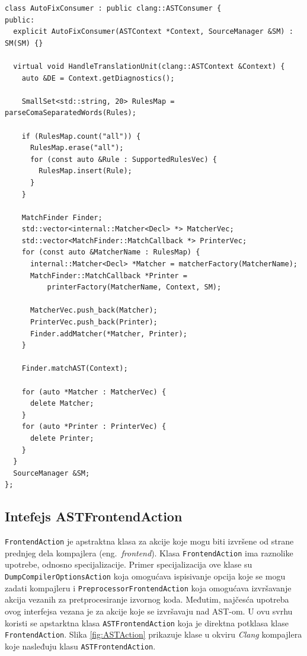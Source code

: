\documentclass[12pt,oneside]{memoir}
\begin{document}
\begin{lstlisting}[style=customc, basicstyle=\tiny, caption={Implementacija klase \texttt{AutoFixConsumer} u okviru alata \textit{Autofix}.}, label=lst:labelConsumer]
class AutoFixConsumer : public clang::ASTConsumer {
public:
  explicit AutoFixConsumer(ASTContext *Context, SourceManager &SM) : SM(SM) {}

  virtual void HandleTranslationUnit(clang::ASTContext &Context) {
    auto &DE = Context.getDiagnostics();

    SmallSet<std::string, 20> RulesMap = parseComaSeparatedWords(Rules);

    if (RulesMap.count("all")) {
      RulesMap.erase("all");
      for (const auto &Rule : SupportedRulesVec) {
        RulesMap.insert(Rule);
      }
    }

    MatchFinder Finder;
    std::vector<internal::Matcher<Decl> *> MatcherVec;
    std::vector<MatchFinder::MatchCallback *> PrinterVec;
    for (const auto &MatcherName : RulesMap) {
      internal::Matcher<Decl> *Matcher = matcherFactory(MatcherName);
      MatchFinder::MatchCallback *Printer =
          printerFactory(MatcherName, Context, SM);

      MatcherVec.push_back(Matcher);
      PrinterVec.push_back(Printer);
      Finder.addMatcher(*Matcher, Printer);
    }

    Finder.matchAST(Context);

    for (auto *Matcher : MatcherVec) {
      delete Matcher;
    }
    for (auto *Printer : PrinterVec) {
      delete Printer;
    }
  }
  SourceManager &SM;
};
\end{lstlisting}

\subsection{Intefejs ASTFrontendAction}

\texttt{FrontendAction} je apstraktna klasa za akcije koje mogu biti izvr\v{s}ene od strane prednjeg dela kompajlera (eng.~\textit{frontend}).
Klasa \texttt{FrontendAction} ima raznolike upotrebe, odnosno specijalizacije. Primer specijalizacija ove klase su \\ \texttt{DumpCompilerOptionsAction}
koja omogu\'{c}ava ispisivanje opcija koje se mogu zadati kompajleru i \texttt{PreprocessorFrontendAction} koja omogu\'{c}ava izvr\v{s}avanje akcija vezanih za pretprocesiranje izvornog koda. Međutim, naj\v{c}es\'{c}a upotreba ovog interfejsa vezana je za akcije koje se izvr\v{s}avaju nad AST-om. U ovu svrhu koristi se apstarktna klasa \texttt{ASTFrontendAction} koja je direktna potklasa klase \texttt{FrontendAction}. Slika \ref{fig:ASTAction} prikazuje klase u okviru \textit{Clang} kompajlera koje nasleđuju klasu \texttt{ASTFrontendAction}. \par
\end{document}
